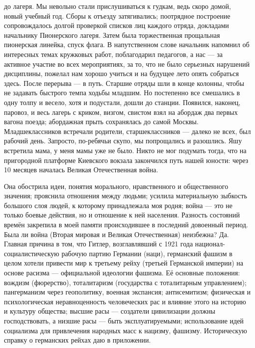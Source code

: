 \label{25-1}
до лагеря. Мы невольно стали прислушиваться к гудкам, ведь скоро домой, новый учебный год. Сборы к отъезду затягивались; поотрядное построение сопровождалось долгой проверкой списков лиц каждого отряда, докладами начальнику Пионерского лагеря. Затем была торжественная прощальная пионерская линейка, спуск флага. В напутственном слове начальник напомнил об интересных темах кружковых работ, поблагодарил педагогов, а нас — за активное участие во всех мероприятиях, за то, что не было серьезных нарушений дисциплины, пожелал нам хорошо учиться и на будущее лето опять собраться здесь. После перерыва — в путь. Старшие отряды шли в конце колонны, чтобы не задавать быстрого темпа ходьбы младшим. Но постепенно все смешались в одну толпу и весело, хотя и подустали, дошли до станции. Появился, наконец, паровоз, и весь лагерь с криком, визгом, свистом взял на абордаж два первых вагона поезда; абордажная прыть сохранялась до самой Москвы. Младшеклассников встречали родители, старшеклассников — далеко не всех, был рабочий день. Запросто, по-ребячьи скупо, мы попрощались и разошлись. Яшу встретила мама, у меня мамы уже не было. Никто не мог подумать тогда, что на пригородной платформе Киевского вокзала закончился путь нашей юности: через 10 месяцев началась Великая Отечественная война.

\label{26-1}
Она обострила идеи, понятия морального, нравственного и общественного значения; прояснила отношения между людьми; усилила материальную зыбкость большого слоя людей, к которому принадлежала моя родня; война — это не только боевые действия, но и отношение к ней населения. Разность состояний времён закрепила в моей памяти происходившее в последний довоенный период. Была ли война (Вторая мировая и Великая Отечественная) неизбежна? Да. Главная причина в том, что Гитлер, возглавлявший с 1921 года национал-социалистическую рабочую партию Германии (наци), германский фашизм в целом хотели привести мир к третьему рейху (третьей Германской империи) на основе расизма — официальной идеологии фашизма. Её основные положения: вождизм (фюрерство), тоталитаризм (государства с тоталитарным управлением); пангерманизм через геополитику, военная экспансия; антисемитизм; физическая и психологическая неравноценность человеческих рас и влияние этого на историю и культуру общества; высшие расы — создатели цивилизации должны господствовать, а низшие расы — быть эксплуатируемыми; использование идей социализма для привлечения народных масс к нацизму, фашизму. Историческую справку о германских рейхах даю в приложении.


